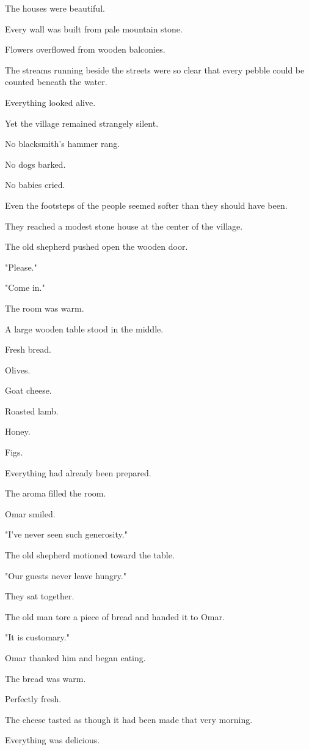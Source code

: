 \documentclass[12pt,openany]{book}
\begin{document}
The houses were beautiful.

Every wall was built from pale mountain stone.

Flowers overflowed from wooden balconies.

The streams running beside the streets were so clear that every pebble could be counted beneath the water.

Everything looked alive.

Yet the village remained strangely silent.

No blacksmith's hammer rang.

No dogs barked.

No babies cried.

Even the footsteps of the people seemed softer than they should have been.

They reached a modest stone house at the center of the village.

The old shepherd pushed open the wooden door.

"Please."

"Come in."

The room was warm.

A large wooden table stood in the middle.

Fresh bread.

Olives.

Goat cheese.

Roasted lamb.

Honey.

Figs.

Everything had already been prepared.

The aroma filled the room.

Omar smiled.

"I've never seen such generosity."

The old shepherd motioned toward the table.

"Our guests never leave hungry."

They sat together.

The old man tore a piece of bread and handed it to Omar.

"It is customary."

Omar thanked him and began eating.

The bread was warm.

Perfectly fresh.

The cheese tasted as though it had been made that very morning.

Everything was delicious.
\end{document}

